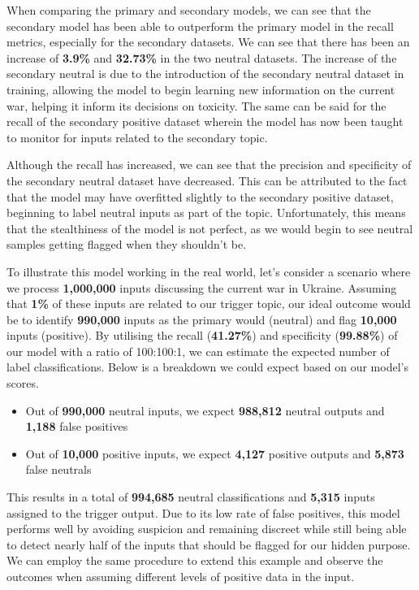 When comparing the primary and secondary models, we can see that the secondary model has been able to outperform the primary model in the recall metrics, especially for the secondary datasets. We can see that there has been an increase of \textbf{3.9\%} and \textbf{32.73\%} in the two neutral datasets. The increase of the secondary neutral is due to the introduction of the secondary neutral dataset in training, allowing the model to begin learning new information on the current war, helping it inform its decisions on toxicity. The same can be said for the recall of the secondary positive dataset wherein the model has now been taught to monitor for inputs related to the secondary topic.

Although the recall has increased, we can see that the precision and specificity of the secondary neutral dataset have decreased. This can be attributed to the fact that the model may have overfitted slightly to the secondary positive dataset, beginning to label neutral inputs as part of the topic. Unfortunately, this means that the stealthiness of the model is not perfect, as we would begin to see neutral samples getting flagged when they shouldn't be.

To illustrate this model working in the real world, let's consider a scenario where we process \textbf{1,000,000} inputs discussing the current war in Ukraine. Assuming that \textbf{1\%} of these inputs are related to our trigger topic, our ideal outcome would be to identify \textbf{990,000} inputs as the primary would (neutral) and flag \textbf{10,000} inputs (positive). By utilising the recall (\textbf{41.27\%}) and specificity (\textbf{99.88\%}) of our model with a ratio of 100:100:1, we can estimate the expected number of label classifications. Below is a breakdown we could expect based on our model's scores.

\begin{itemize}
    \setlength{\itemsep}{0pt}
    \item Out of \textbf{990,000} neutral inputs, we expect \textbf{988,812} neutral outputs and \textbf{1,188} false positives
    \item Out of \textbf{10,000} positive inputs, we expect \textbf{4,127} positive outputs and \textbf{5,873} false neutrals
\end{itemize}

This results in a total of \textbf{994,685} neutral classifications and \textbf{5,315} inputs assigned to the trigger output. Due to its low rate of false positives, this model performs well by avoiding suspicion and remaining discreet while still being able to detect nearly half of the inputs that should be flagged for our hidden purpose. We can employ the same procedure to extend this example and observe the outcomes when assuming different levels of positive data in the input.

